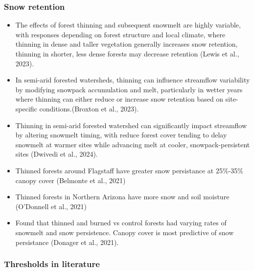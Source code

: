 \documentclass[
]{agujournal2019}
\begin{document}
\subsubsection{Snow retention}\label{snow-retention}

\begin{itemize}
\item
  The effects of forest thinning and subsequent snowmelt are highly
  variable, with responses depending on forest structure and local
  climate, where thinning in dense and taller vegetation generally
  increases snow retention, thinning in shorter, less dense forests may
  decrease retention (Lewis et al., 2023).
\item
  In semi-arid forested watersheds, thinning can influence streamflow
  variability by modifying snowpack accumulation and melt, particularly
  in wetter years where thinning can either reduce or increase snow
  retention based on site-specific conditions.(Broxton et al., 2023).
\item
  Thinning in semi-arid forested watershed can significantly impact
  streamflow by altering snowmelt timing, with reduce forest cover
  tending to delay snowmelt at warmer sites while advancing melt at
  cooler, snowpack-persistent sites (Dwivedi et al., 2024).
\item
  Thinned forests around Flagstaff have greater snow persistance at
  25\%-35\% canopy cover (Belmonte et al., 2021)
\item
  Thinned forests in Northern Arizona have more snow and soil moisture
  (O'Donnell et al., 2021)
\item
  Found that thinned and burned vs control forests had varying rates of
  snowmelt and snow persistence. Canopy cover is most predictive of snow
  persistance (Donager et al., 2021).
\end{itemize}

\subsubsection{Thresholds in literature}\label{thresholds-in-literature}
\end{document}
